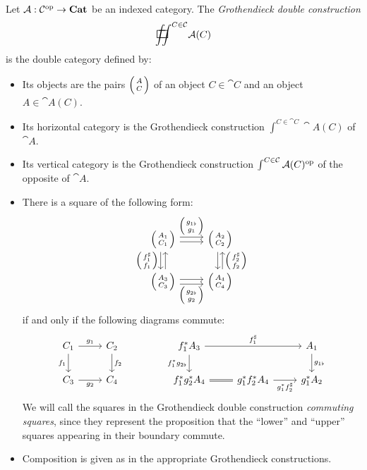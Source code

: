 \documentclass[DynamicalBook]{subfiles}
\begin{document}
\begin{definition}\label{def.groth_double_construction}
  Let $\mathcal{A} : \mathcal{C}^{\textnormal{op}} \to \textbf{Cat}$ be an indexed category. The
  \emph{Grothendieck double construction}
$$\sqiint^{C \in \cat{C}} \cat{A}(C)$$
is the double category defined by:
\begin{itemize}
\item Its objects are the pairs $\lens{A}{C}$ of an object $C \in \cat{C}$ and
  an object $A \in \cat{A}(C)$.
\item Its horizontal category is the Grothendieck construction $\int^{C \in
    \cat{C}}\cat{A}(C)$ of $\cat{A}$.
\item Its vertical category is the Grothendieck construction $\int^{C \in
    \mathcal{C}} \mathcal{A}(C)^{\textnormal{op}}$ of the opposite of $\cat{A}$.
\item There is a square of the following form:
  \begin{equation}\label{eqn.groth_double_construction}
    \begin{tikzcd}
      \lens{A_1}{C_1} \arrow[r, shift left, "\lens{g_{1\flat}}{g_1}"]\arrow[r, shift right] \arrow[d, leftarrow,  shift left] \arrow[d, shift right, "\lens{f_1^{\sharp}}{f_1}"'] & \lens{A_2}{C_2} \arrow[d, leftarrow, shift left, "\lens{f_2^{\sharp}}{f_2}"] \arrow[d, shift right] \\
      \lens{A_3}{C_3} \arrow[r, shift left]\arrow[r, shift right,
      "\lens{g_{2\flat}}{g_2}"'] & \lens{A_4}{C_4}
    \end{tikzcd}
  \end{equation}
  if and only if the following diagrams commute:
  \begin{equation} \label{eqn.groth_double_diagram}
    \begin{tikzcd}
      C_1 \arrow[r, "g_1"] \arrow[d, "f_1"'] & C_2 \arrow[d, "f_2"] &  & f_1^{\ast}A_3 \arrow[rr, "f_1^{\sharp}"] \arrow[d, "f_1^{\ast}g_{2\flat}"'] &                                                              & A_1 \arrow[d, "g_{1\flat}"] \\
      C_3 \arrow[r, "g_2"'] & C_4 & & f_1^{\ast}g_2^{\ast}A_4 \arrow[r, equals]
      & g_1^{\ast}f_2^{\ast}A_4 \arrow[r, "g_1^{\ast}f_2^{\sharp}"'] &
      g_1^{\ast}A_2
    \end{tikzcd}
  \end{equation}
  We will call the squares in the Grothendieck double construction
  \emph{commuting squares}, since they represent the proposition that the
  ``lower'' and ``upper'' squares appearing in their boundary commute.
\item Composition is given as in the appropriate Grothendieck constructions.
\end{itemize}

\end{definition}
\end{document}
